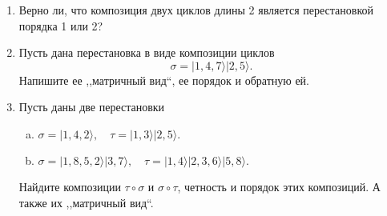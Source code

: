 \begin{enumerate}
    \item Верно ли, что композиция двух циклов длины 2 является перестановкой порядка 1 или 2?
    \item Пусть дана перестановка в виде композиции циклов  \[
            \sigma = | 1, 4, 7 \rangle |2, 5 \rangle
        .\]  
        Напишите ее ,,матричный вид``, ее порядок и обратную ей.
    \item Пусть даны две перестановки 
        \begin{enumerate}[(a)]
            \item \(
                \sigma = | 1, 4, 2 \rangle 
                , \quad
                \tau = | 1, 3 \rangle | 2, 5 \rangle
            .\)
            \item \(
                \sigma = | 1, 8, 5, 2 \rangle | 3, 7 \rangle
                , \quad
                \tau = | 1, 4\rangle |2,  3, 6 \rangle | 5, 8 \rangle
            .\)
        \end{enumerate}
        Найдите композиции $\tau \circ \sigma$ и $\sigma \circ \tau$, четность и порядок этих композиций.
        А также их ,,матричный вид``.
\end{enumerate}
